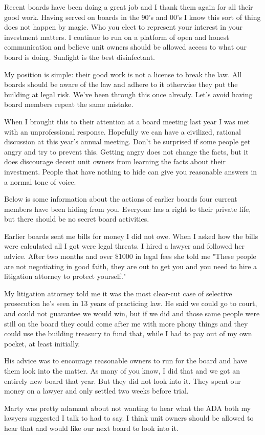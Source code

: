 \documentclass[10pt,letterpaper]{article}
\begin{document}
 
 
Recent boards have been doing a great job and I thank them again for all their good work. Having served on boards in the 90's and 00's I know this sort of thing does not happen by magic. Who you elect to represent your interest in your investment matters. I continue to run on a platform of open and honest communication and believe unit owners should be allowed access to what our board is doing. Sunlight is the best disinfectant.

My position is simple: their good work is not a license to break the law. All boards should be aware of the law and adhere to it otherwise they put the building at legal risk. We've been through this once already.  Let's avoid having board members repeat the same mistake.

When I brought this to their attention at a board meeting last year I was met with an unprofessional response. Hopefully we can have a civilized, rational discussion at this year's annual meeting. Don't be surprised if some people get angry and try to prevent this.  Getting angry does not change the facts, but it does discourage decent unit owners from learning the facts about their investment. People that have nothing to hide can give you reasonable answers in a normal tone of voice.

Below is some information about the actions of earlier boards four current members have been hiding from you. Everyone has a right to their private life, but there should be no secret board activities.  

Earlier boards sent me bills for money I did not owe. When I asked how the bills were calculated all I got were legal threats. I hired a lawyer and followed her advice. After two months and over \$1000 in legal fees she told me "These people are not negotiating in good faith, they are out to get you and you need to hire a litigation attorney to protect yourself."

My litigation attorney told me it was the most clear-cut case of selective prosecution he's seen in 13 years of practicing law.  He said we could go to court, and could not guarantee we would win, but if we did and those same people were still on the board they could come after me with more phony things and they could use the building treasury to fund that, while I had to pay out of my own pocket, at least initially.

His advice was to encourage reasonable owners to run for the board and have them look into the matter. As many of you know, I did that and we got an entirely new board that year. But they did not look into it. They spent our money on a lawyer and only settled two weeks before trial.
	
Marty was pretty adamant about not wanting to hear what the ADA both my lawyers suggested I talk to had to say. I think unit owners should be allowed to hear that and would like our next board to look into it. 


\end{document}
